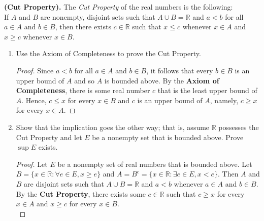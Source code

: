 \documentclass[12pt]{article}
\newcommand{\R}{\mathbb{R}}
\newenvironment{problem}[2][Problem]{\begin{trivlist}
		\item[\hskip \labelsep {\bfseries #1}\hskip \labelsep {\bfseries #2.}]}{\end{trivlist}}
\begin{document}
		\begin{problem}{1.3.10}
			\textbf{(Cut Property).} The \textit{Cut Property} of the real numbers is the following:\\
			If $A$ and $B$ are nonempty, disjoint sets such that $A\cup B =\R$ and $a<b$ for all $a\in A$ and $b\in B$, then there exists $c\in \R$ such that $x\leq c$ whenever $x\in A$ and $x\geq c$ whenever $x\in B$.
			\begin{enumerate}[label=(\alph*)]
				\item Use the Axiom of Completeness to prove the Cut Property.
				\begin{proof}
					Since $a<b$ for all $a\in A$ and $b\in B$, it follows that every $b\in B$ is an upper bound of $A$ and so $A$ is bounded above. By the \textbf{Axiom of Completeness}, there is some real number $c$ that is the least upper bound of $A$. Hence, $c\leq x$ for every $x\in B$ and $c$ is an upper bound of $A$, namely,  $c\geq x$ for every $x\in A$.
				\end{proof}
				\item Show that the implication goes the other way; that is, assume $\R$ possesses the Cut Property and let $E$ be a nonempty set that is bounded above. Prove $\sup E$ exists.
				\begin{proof}
					Let $E$ be a nonempty set of real numbers that is bounded above. Let $B = \{x\in \R: \forall e\in E, x \geq e\}$ and $A=B^{c} = \{x\in \R:\exists e\in E, x < e \}$. Then $A$ and $B$ are disjoint sets such that $A\cup B = \R$ and $a<b$ whenever $a\in A$ and $b\in B$. By the \textbf{Cut Property}, there exists some $c\in \R$ such that $c\geq x$ for every $x\in A$ and $x\geq c$ for every $x\in B$. \\
					

\end{proof}
\end{enumerate}
\end{problem}
\end{document}

